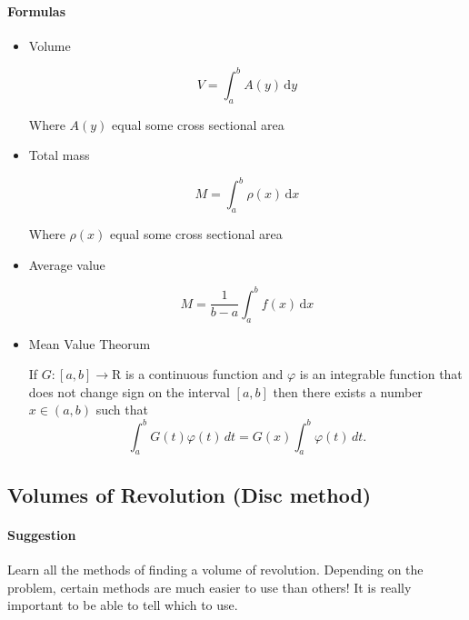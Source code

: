 \documentclass[11pt]{article}
\begin{document}
		\paragraph{Formulas} 
			\begin{itemize}
				\item Volume
					
					\begin{equation*}
					V = \int_a^b \! A(y) \, \mathrm{d}y
					\end{equation*}
					\begin{flushright}
						Where $A(y)$ equal some cross sectional area
					\end{flushright}
				\item Total mass
					
					\begin{equation*}
					M = \int_a^b \! \rho(x) \, \mathrm{d}x
					\end{equation*}
					\begin{flushright}
				 Where $\rho(x)$ equal some cross sectional area
					\end{flushright}
					
				\item Average value
					
					\begin{equation*}
					M = \frac{1}{b - a}\int_a^b \! f(x) \, \mathrm{d}x
					\end{equation*}
					
				\item Mean Value Theorum
				
					If $ G:[a,b]\to \mathrm{R} $ is a continuous function and $ \varphi $ is an integrable function that does not 
					change sign on the interval $[a, b]$  then there exists a number $ x\in(a,b)$ such that
					\begin{equation*}
						\int_a^b G(t)\varphi (t) \, dt=G(x) \int_a^b \varphi (t) \, dt.
					\end{equation*}	
				\end{itemize}
				
				\pagebreak
				
	\subsection{Volumes of Revolution (Disc method)}
		\paragraph{Suggestion} Learn all the methods of finding a volume of revolution. 
		Depending on the problem, certain methods are much easier to use than others! 
		It is really important to be able to tell which to use.
		
\end{document}
